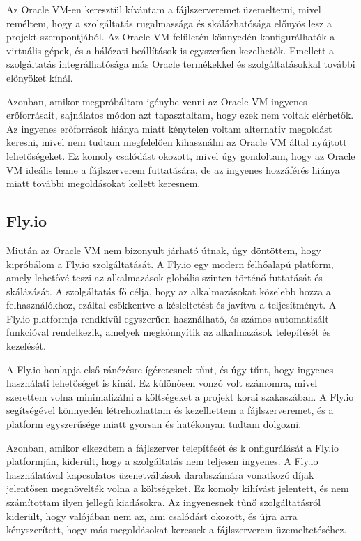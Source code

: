 Az Oracle VM-en keresztül kívántam a fájlszerveremet üzemeltetni, mivel reméltem, hogy a szolgáltatás rugalmassága és skálázhatósága előnyös lesz a projekt szempontjából. Az Oracle VM felületén könnyedén konfigurálhatók a virtuális gépek, és a hálózati beállítások is egyszerűen kezelhetők. Emellett a szolgáltatás integrálhatósága más Oracle termékekkel és szolgáltatásokkal további előnyöket kínál.

Azonban, amikor megpróbáltam igénybe venni az Oracle VM ingyenes erőforrásait, sajnálatos módon azt tapasztaltam, hogy ezek nem voltak elérhetők. Az ingyenes erőforrások hiánya miatt kénytelen voltam alternatív megoldást keresni, mivel nem tudtam megfelelően kihasználni az Oracle VM által nyújtott lehetőségeket. Ez komoly csalódást okozott, mivel úgy gondoltam, hogy az Oracle VM ideális lenne a fájlszerverem futtatására, de az ingyenes hozzáférés hiánya miatt további megoldásokat kellett keresnem.


\subsection{Fly.io}
Miután az Oracle VM nem bizonyult járható útnak, úgy döntöttem, hogy kipróbálom a Fly.io szolgáltatását. A Fly.io egy modern felhőalapú platform, amely lehetővé teszi az alkalmazások globális szinten történő futtatását és skálázását. A szolgáltatás fő célja, hogy az alkalmazásokat közelebb hozza a felhasználókhoz, ezáltal csökkentve a késleltetést és javítva a teljesítményt. A Fly.io platformja rendkívül egyszerűen használható, és számos automatizált funkcióval rendelkezik, amelyek megkönnyítik az alkalmazások telepítését és kezelését.

A Fly.io honlapja első ránézésre ígéretesnek tűnt, és úgy tűnt, hogy ingyenes használati lehetőséget is kínál. Ez különösen vonzó volt számomra, mivel szerettem volna minimalizálni a költségeket a projekt korai szakaszában. A Fly.io segítségével könnyedén létrehozhattam és kezelhettem a fájlszerveremet, és a platform egyszerűsége miatt gyorsan és hatékonyan tudtam dolgozni.

Azonban, amikor elkezdtem a fájlszerver telepítését és k
onfigurálását a Fly.io platformján, kiderült, hogy a szolgáltatás nem teljesen ingyenes.
A Fly.io használatával kapcsolatos üzenetváltások darabszámára vonatkozó díjak jelentősen 
megnövelték volna a költségeket. Ez komoly kihívást jelentett, és nem számítottam ilyen jellegű kiadásokra. 
Az ingyenesnek tűnő szolgáltatásról kiderült, 
hogy valójában nem az, ami csalódást okozott, 
és újra arra kényszerített, hogy más megoldásokat keressek a fájlszerverem üzemeltetéséhez.

